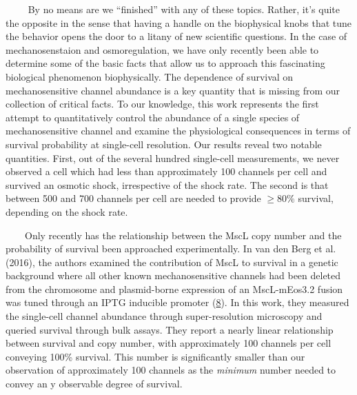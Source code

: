 ~~~~
By no
means
are we
``finished''
with
any of
these
topics.
Rather,
it's
quite
the
opposite
in the
sense
that
having
a
handle
on the
biophysical
knobs
that
tune
the
behavior
opens
the
door
to a
litany
of new
scientific
questions.
In the
case
of
mechanosenstaion
and
osmoregulation,
we
have
only
recently
been
able
to
determine
some
of the
basic
facts
that
allow
us to
approach
this
fascinating
biological
phenomenon
biophysically.
The
dependence
of
survival
on
mechanosensitive
channel
abundance
is a
key
quantity
that
is
missing
from
our
collection
of
critical
facts.
To our
knowledge,
this
work
represents
the
first
attempt
to
quantitatively
control
the
abundance
of a
single
species
of
mechanosensitive
channel
and
examine
the
physiological
consequences
in
terms
of
survival
probability
at
single-cell
resolution.
Our
results
reveal
two
notable
quantities.
First,
out of
the
several
hundred
single-cell
measurements,
we
never
observed
a cell
which
had
less
than
approximately
100
channels
per
cell
and
survived
an
osmotic
shock,
irrespective
of the
shock
rate.
The
second
is
that
between
500
and
700
channels
per
cell
are
needed
to
provide
\(\geq 80\%\)
survival,
depending
on the
shock
rate.

~~~~Only
recently
has
the
relationship
between
the
MscL
copy
number
and
the
probability
of
survival
been
approached
experimentally.
In van
den
Berg
et al.
(2016),
the
authors
examined
the
contribution
of
MscL
to
survival
in a
genetic
background
where
all
other
known
mechanosensitive
channels
had
been
deleted
from
the
chromosome
and
plasmid-borne
expression
of an
MscL-mEos3.2
fusion
was
tuned
through
an
IPTG
inducible
promoter
(\protect\hyperlink{ref-vandenberg2016}{8}).
In
this
work,
they
measured
the
single-cell
channel
abundance
through
super-resolution
microscopy
and
queried
survival
through
bulk
assays.
They
report
a
nearly
linear
relationship
between
survival
and
copy
number,
with
approximately
100
channels
per
cell
conveying
100\%
survival.
This
number
is
significantly
smaller
than
our
observation
of
approximately
100
channels
as the
\emph{minimum}
number
needed
to
convey
an y
observable
degree
of
survival.

